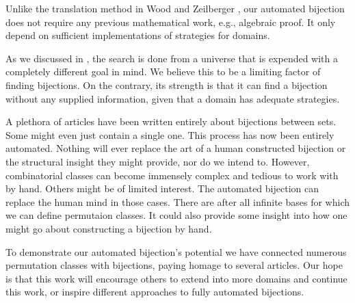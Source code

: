 Unlike the translation method in Wood and Zeilberger \cite{wood_zeilberger}, our automated bijection does not require any previous mathematical work, e.g., algebraic proof. It only depend on sufficient implementations of strategies for domains.

As we discussed in , the search is done from a universe that is expended with a completely different goal in mind. We believe this to be a limiting factor of finding bijections. On the contrary, its strength is that it can find a bijection without any supplied information, given that a domain has adequate strategies.

A plethora of articles have been written entirely about bijections between sets. Some might even just contain a single one. This process has now been entirely automated. Nothing will ever replace the art of a human constructed bijection or the structural insight they might provide, nor do we intend to. However, combinatorial classes can become immensely complex and tedious to work with by hand. Others might be of limited interest. The automated bijection can replace the human mind in those cases. There are after all infinite bases for which we can define permutaion classes. It could also provide some insight into how one might go about constructing a bijection by hand.

To demonstrate our automated bijection's potential we have connected numerous permutation classes with bijections, paying homage to several articles. Our hope is that this work will encourage others to extend \css{} into more domains and continue this work, or inspire different approaches to fully automated bijections.